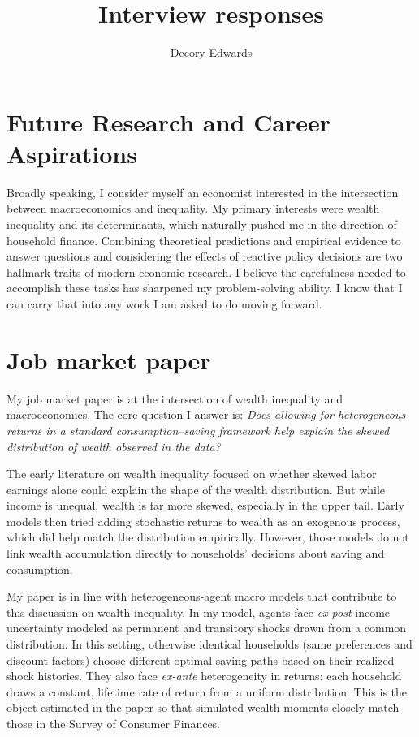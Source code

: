 \documentclass{scrartcl}
\title{Interview responses}
\author{Decory Edwards}
\begin{document}
\maketitle

\section{\large Future Research and Career Aspirations}

\par Broadly speaking, I consider myself an economist interested in the intersection between macroeconomics and inequality. My primary interests were wealth inequality and its determinants, which naturally pushed me in the direction of household finance. Combining theoretical predictions and empirical evidence to answer questions and considering the effects of reactive policy decisions are two hallmark traits of modern economic research. I believe the carefulness needed to accomplish these tasks has sharpened my problem-solving ability. I know that I can carry that into any work I am asked to do moving forward.

\section{Job market paper}

\par My job market paper is at the intersection of wealth inequality and macroeconomics. The core question I answer is: \textit{Does allowing for heterogeneous returns in a standard consumption–saving framework help explain the skewed distribution of wealth observed in the data?}

\vspace{0.5em}
\noindent
The early literature on wealth inequality focused on whether skewed labor earnings alone could explain the shape of the wealth distribution. But while income is unequal, wealth is far more skewed, especially in the upper tail. Early models then tried adding stochastic returns to wealth as an exogenous process, which did help match the distribution empirically. However, those models do not link wealth accumulation directly to households’ decisions about saving and consumption.

\vspace{0.5em}
\noindent
My paper is in line with heterogeneous-agent macro models that contribute to this discussion on wealth inequality. In my model, agents face \emph{ex-post} income uncertainty modeled as permanent and transitory shocks drawn from a common distribution. In this setting, otherwise identical households (same preferences and discount factors) choose different optimal saving paths based on their realized shock histories. They also face \emph{ex-ante} heterogeneity in returns: each household draws a constant, lifetime rate of return from a uniform distribution. This is the object estimated in the paper so that simulated wealth moments closely match those in the Survey of Consumer Finances.
\end{document}

